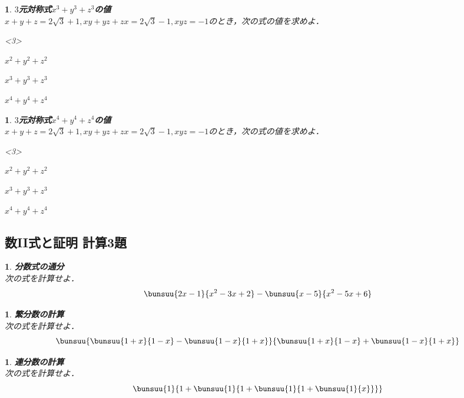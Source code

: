 \documentclass[10pt,
fleqn,
dvipdfmx,
uplatex
]{jsarticle}
\newtheorem{question}[Question]{}
\begin{document}
\begin{question}{\bf\boldmath $3$元対称式$x^3+y^3+z^3$の値}\\
$x+y+z=2\sqrt 3+1, xy+yz+zx=2\sqrt 3-1, xyz=-1$のとき，次の式の値を求めよ．
\begin{edaenumerate}<3>
\item $x^2+y^2+z^2$
\item $x^3+y^3+z^3$
\item $x^4+y^4+z^4$
\end{edaenumerate}

\end{question}



\begin{question}{\bf\boldmath $3$元対称式$x^4+y^4+z^4$の値}\\
$x+y+z=2\sqrt 3+1, xy+yz+zx=2\sqrt 3-1, xyz=-1$のとき，次の式の値を求めよ．
\begin{edaenumerate}<3>
\item $x^2+y^2+z^2$
\item $x^3+y^3+z^3$
\item $x^4+y^4+z^4$
\end{edaenumerate}

\end{question}

\subsection{数II式と証明 計算3題}



\begin{question}{\bf\boldmath 分数式の通分}\\
次の式を計算せよ．
\[\bunsuu{{2x-1}}{{x^2-3x+2}}-\bunsuu{{x-5}}{{x^2-5x+6}}\]
\end{question}



\begin{question}{\bf\boldmath 繁分数の計算}\\
次の式を計算せよ．
\[\bunsuu{{\bunsuu{{1+x}}{{1-x}}-\bunsuu{{1-x}}{{1+x}}}}{{\bunsuu{{1+x}}{{1-x}}+\bunsuu{{1-x}}{{1+x}}}}\]
\end{question}



\begin{question}{\bf\boldmath 連分数の計算}\\
次の式を計算せよ．
\[\bunsuu{1}{{}1+\bunsuu{1}{{}1+\bunsuu{1}{{}1+\bunsuu{1}{x}}}}\]
\end{question}
\end{document}
